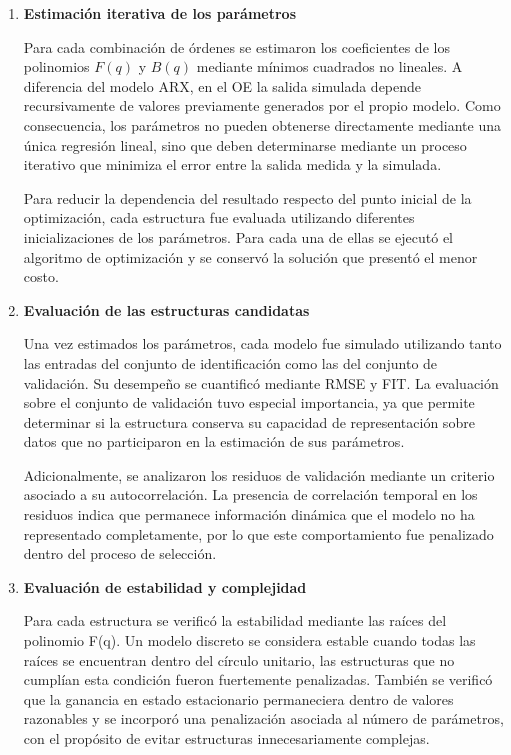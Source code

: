 \documentclass[11pt]{report}
\begin{document}
\begin{enumerate}
    \item \textbf{Estimación iterativa de los parámetros}

    Para cada combinación de órdenes se estimaron los coeficientes de los polinomios $F(q)$ y $B(q)$ mediante mínimos cuadrados no lineales. A diferencia del modelo ARX, en el OE la salida simulada depende recursivamente de valores previamente generados por el propio modelo. Como consecuencia, los parámetros no pueden obtenerse directamente mediante una única regresión lineal, sino que deben determinarse mediante un proceso iterativo que minimiza el error entre la salida medida y la simulada.

Para reducir la dependencia del resultado respecto del punto inicial de la optimización, cada estructura fue evaluada utilizando diferentes inicializaciones de los parámetros. Para cada una de ellas se ejecutó el algoritmo de optimización y se conservó la solución que presentó el menor costo.

    \item \textbf{Evaluación de las estructuras candidatas}


    
Una vez estimados los parámetros, cada modelo fue simulado utilizando tanto las entradas del conjunto de identificación como las del conjunto de validación. Su desempeño se cuantificó mediante RMSE y FIT. La evaluación sobre el conjunto de validación tuvo especial importancia, ya que permite determinar si la estructura conserva su capacidad de representación sobre datos que no participaron en la estimación de sus parámetros.

Adicionalmente, se analizaron los residuos de validación mediante un criterio asociado a su autocorrelación. La presencia de correlación temporal en los residuos indica que permanece información dinámica que el modelo no ha representado completamente, por lo que este comportamiento fue penalizado dentro del proceso de selección.

    
    \item \textbf{Evaluación de estabilidad y complejidad}

Para cada estructura se verificó la estabilidad mediante las raíces del polinomio F(q). Un modelo discreto se considera estable cuando todas las raíces se encuentran dentro del círculo unitario, las estructuras que no cumplían esta condición fueron fuertemente penalizadas. También se verificó que la ganancia en estado estacionario permaneciera dentro de valores razonables y se incorporó una penalización asociada al número de parámetros, con el propósito de evitar estructuras innecesariamente complejas.


\end{enumerate}
\end{document}
